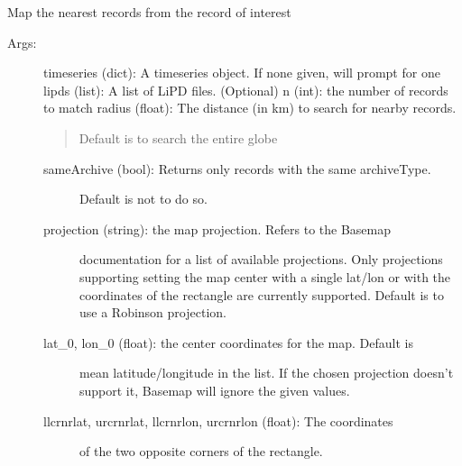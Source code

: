 \documentclass[letterpaper,10pt,english]{sphinxmanual}
\begin{document}

\begin{fulllineitems}
\label{\detokenize{Main:pyleoclim.mapNearRecords}}
Map the nearest records from the record of interest
\begin{description}
\item[{Args:}] \leavevmode
timeseries (dict): A timeseries object. If none given, will prompt for one
lipds (list): A list of LiPD files. (Optional)
n (int): the number of records to match
radius (float): The distance (in km) to search for nearby records.
\begin{quote}

Default is to search the entire globe
\end{quote}
\begin{description}
\item[{sameArchive (bool): Returns only records with the same archiveType.}] \leavevmode
Default is not to do so.

\item[{projection (string): the map projection. Refers to the Basemap}] \leavevmode
documentation for a list of available projections. Only projections
supporting setting the map center with a single lat/lon or with
the coordinates of the rectangle are currently supported.
Default is to use a Robinson projection.

\item[{lat\_0, lon\_0 (float): the center coordinates for the map. Default is}] \leavevmode
mean latitude/longitude in the list.
If the chosen projection doesn’t support it, Basemap will
ignore the given values.

\item[{llcrnrlat, urcrnrlat, llcrnrlon, urcrnrlon (float): The coordinates}] \leavevmode
of the two opposite corners of the rectangle.

\end{description}


\end{description}
\end{fulllineitems}
\end{document}
